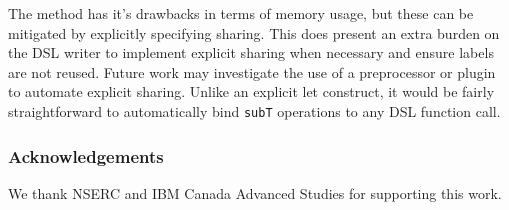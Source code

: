 \documentclass[runningheads]{llncs}
\begin{document}
The method has it's drawbacks in terms of memory usage, but these can be
mitigated by explicitly specifying sharing. This does present an extra burden on
the DSL writer to implement explicit sharing when necessary and ensure labels
are not reused. Future work may investigate the use of a preprocessor or plugin
to automate explicit sharing. Unlike an explicit let construct, it would be
fairly straightforward to automatically bind \texttt{subT}
operations to any DSL function call.

\subsubsection{Acknowledgements} We thank NSERC and IBM Canada Advanced Studies for supporting this work.
%
%


\end{document}
